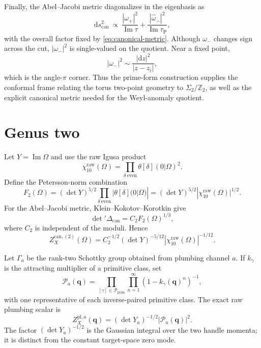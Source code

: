 \documentclass[11pt]{article}
\newcommand{\dd}{\mathrm d}
\newcommand{\cP}{\mathcal P}
\newcommand{\pl}{\mathrm{pl}}
\newcommand{\can}{\mathrm{can}}
\begin{document}
Finally, the Abel--Jacobi metric diagonalizes in the eigenbasis as
\begin{equation}
 \dd s_{\can}^2\ \propto\
 \frac{|\omega_+|^2}{\operatorname{Im}\tau}
 +\frac{|\widehat\omega_-|^2}{\operatorname{Im}\tau_{\mathrm P}},
 \label{eq:bielliptic-canonical-metric}
\end{equation}
with the overall factor fixed by \eqref{eq:canonical-metric}.  Although
$\omega_-$ changes sign across the cut, $|\omega_-|^2$ is single-valued on
the quotient.  Near a fixed point,
\begin{equation}
 |\omega_-|^2\sim\frac{|\dd z|^2}{|z-z_i|},
\end{equation}
which is the angle-$\pi$ corner.  Thus the prime-form construction supplies
the conformal frame relating the torus two-point geometry to
$\Sigma_2/\mathbb Z_2$, as well as the explicit canonical metric needed for
the Weyl-anomaly quotient.

\section{Genus two}

Let $Y=\operatorname{Im}\Omega$ and use the raw Igusa product
\begin{equation}
 \chi_{10}^{\mathrm{raw}}(\Omega)
 =\prod_{\delta\ \mathrm{even}}
   \theta[\delta](0|\Omega)^2.
 \label{eq:chi10}
\end{equation}
Define the Petersson-norm combination
\begin{equation}
 F_2(\Omega)
 =(\det Y)^{5/2}
   \prod_{\delta\ \mathrm{even}}|\theta[\delta](0|\Omega)|
 =(\det Y)^{5/2}|\chi_{10}^{\mathrm{raw}}(\Omega)|^{1/2}.
 \label{eq:F2}
\end{equation}
For the Abel--Jacobi metric, Klein--Kokotov--Korotkin give
\begin{equation}
 \det{}'\Delta_{\can}=C_2 F_2(\Omega)^{1/3},
\end{equation}
where $C_2$ is independent of the moduli.  Hence
\begin{equation}
 \boxed{
 Z_X^{\can,(2)}(\Omega)
 =C_2^{-1/2}(\det Y)^{-5/12}
  |\chi_{10}^{\mathrm{raw}}(\Omega)|^{-1/12}.}
 \label{eq:genus2-canonical}
\end{equation}

Let $\Gamma_a$ be the rank-two Schottky group obtained from plumbing channel
$a$.  If $k_\gamma$ is the attracting multiplier of a primitive class, set
\begin{equation}
 \cP_a(\mathbf q)
 =\prod_{[\gamma]\in\mathcal P_{\mathrm{prim}}}
   \prod_{n=1}^{\infty}(1-k_\gamma(\mathbf q)^n)^{-1},
 \label{eq:schottky-product}
\end{equation}
with one representative of each inverse-paired primitive class.  The exact
raw plumbing scalar is
\begin{equation}
 \boxed{
 Z_X^{\pl,a}(\mathbf q)
 =(\det Y_a)^{-1/2}|\cP_a(\mathbf q)|^2.}
 \label{eq:genus2-plumbing}
\end{equation}
The factor $(\det Y_a)^{-1/2}$ is the Gaussian integral over the two handle
momenta; it is distinct from the constant target-space zero mode.
\end{document}
